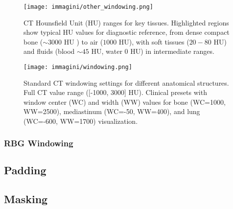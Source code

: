 \begin{figure}
    \centering
    \texttt{[image: immagini/other\_windowing.png]}
    \caption{CT Hounsfield Unit (HU) ranges for key tissues. Highlighted regions show typical HU values for diagnostic reference, from dense compact bone ($\sim 3000$ HU ) to air ($1000$ HU), with soft tissues ($20-80$ HU) and fluids (blood $\sim 45$ HU, water $0$ HU) in intermediate ranges.}
    \label{fig:general_windowing}
\end{figure}

\begin{figure}
    \centering
    \texttt{[image: immagini/windowing.png]}
    \caption{Standard CT windowing settings for different anatomical structures. Full CT value range ([-1000, 3000] HU). Clinical presets with window center (WC) and width (WW) values for bone (WC=1000, WW=2500), mediastinum (WC=-50, WW=400), and lung (WC=-600, WW=1700) visualization.}
    \label{fig:windowing_lung}
\end{figure}

\subsubsection{RBG Windowing}
\subsection{Padding}
\subsection{Masking}
